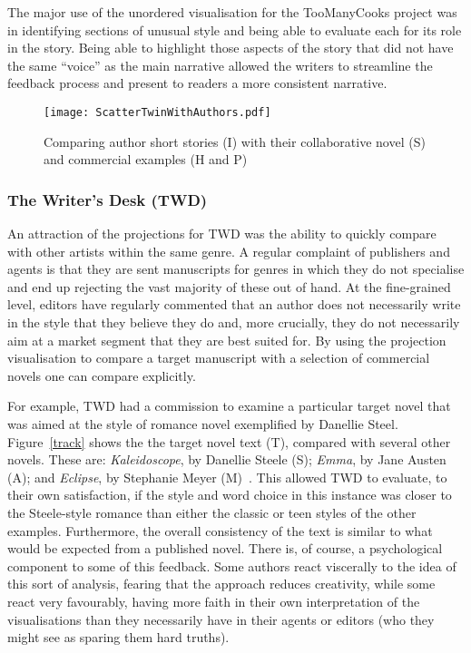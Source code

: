\documentclass{article}
\begin{document}
The major use of the unordered visualisation for the TooManyCooks project was in identifying sections of unusual style and being able to evaluate each for its role in the story. Being able to highlight those aspects of the story that did not have the same ``voice'' as the main narrative allowed the writers to streamline the feedback process and present to readers a more consistent narrative.  
\begin{figure}
\begin{center}
\texttt{[image: ScatterTwinWithAuthors.pdf]}
\caption{Comparing author short stories (I) with their collaborative novel (S) and  commercial examples (H and P)}
\label{strodesScatter}
\end{center}
\end{figure}


\subsubsection{The Writer's Desk (TWD)} 
An attraction of the projections for TWD was the ability to quickly compare with other artists within the same genre.  A regular complaint of publishers and agents is that they are sent manuscripts for genres in which they do not specialise and end up rejecting the vast majority of these out of hand.  At the fine-grained level, editors have regularly commented that an author does not necessarily write in the style that they believe they do and, more crucially, they do not necessarily aim at a market segment that they are best suited for.   By using the projection visualisation to compare a target manuscript with a selection of commercial novels one can compare explicitly. 

For example, TWD had a commission to  examine a particular target novel that was aimed at the style of romance novel exemplified by Danellie Steel.  Figure~\ref{track} shows the the target novel text (T), compared with several other novels. These are: {\em Kaleidoscope}, by Danellie Steele (S); {\em Emma}, 
by Jane Austen (A); and {\em Eclipse}, by  Stephanie Meyer (M)~\cite{Steel198811,emma,Meyer200708}.  This allowed  TWD to evaluate, to their own satisfaction, if  the style and word choice in this instance was closer to the Steele-style romance than either the classic or teen styles of the other examples. Furthermore, the overall consistency of the text is similar to what would be expected from a published novel.  There is, of course, a psychological component to some of this feedback. Some authors react viscerally to the idea of this sort of analysis, fearing that the approach reduces creativity, while some react very favourably, having more faith in their own interpretation of the visualisations than they necessarily have in their agents or editors (who they might see as sparing them hard truths).
\end{document}
